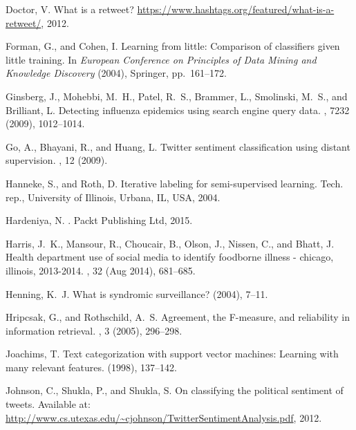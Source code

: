 \documentclass[10pt,letterpaper]{article}
\begin{document}
\begin{thebibliography}{10}
{\sc Doctor, V.}
\newblock What is a retweet?
\newblock \url{https://www.hashtags.org/featured/what-is-a-retweet/}, 2012.

{\sc Forman, G., and Cohen, I.}
\newblock Learning from little: Comparison of classifiers given little
  training.
\newblock In {\em European Conference on Principles of Data Mining and
  Knowledge Discovery\/} (2004), Springer, pp.~161--172.

{\sc Ginsberg, J., Mohebbi, M.~H., Patel, R.~S., Brammer, L., Smolinski, M.~S.,
  and Brilliant, L.}
\newblock Detecting influenza epidemics using search engine query data.
, 7232 (2009), 1012--1014.

{\sc Go, A., Bhayani, R., and Huang, L.}
\newblock Twitter sentiment classification using distant supervision.
, 12 (2009).

{\sc Hanneke, S., and Roth, D.}
\newblock Iterative labeling for semi-supervised learning.
\newblock Tech. rep., University of Illinois, Urbana, IL, USA, 2004.

{\sc Hardeniya, N.}
.
\newblock Packt Publishing Ltd, 2015.

{\sc Harris, J.~K., Mansour, R., Choucair, B., Olson, J., Nissen, C., and
  Bhatt, J.}
\newblock Health department use of social media to identify foodborne illness -
  chicago, illinois, 2013-2014.
, 32 (Aug 2014), 681--685.

{\sc Henning, K.~J.}
\newblock What is syndromic surveillance?
 (2004), 7--11.

{\sc Hripcsak, G., and Rothschild, A.~S.}
\newblock Agreement, the {F-measure}, and reliability in information retrieval.
, 3
  (2005), 296--298.

{\sc Joachims, T.}
\newblock Text categorization with support vector machines: Learning with many
  relevant features.
 (1998), 137--142.

{\sc Johnson, C., Shukla, P., and Shukla, S.}
\newblock On classifying the political sentiment of tweets.
\newblock Available at:
  \url{http://www.cs.utexas.edu/~cjohnson/TwitterSentimentAnalysis.pdf}, 2012.


\end{thebibliography}
\end{document}
